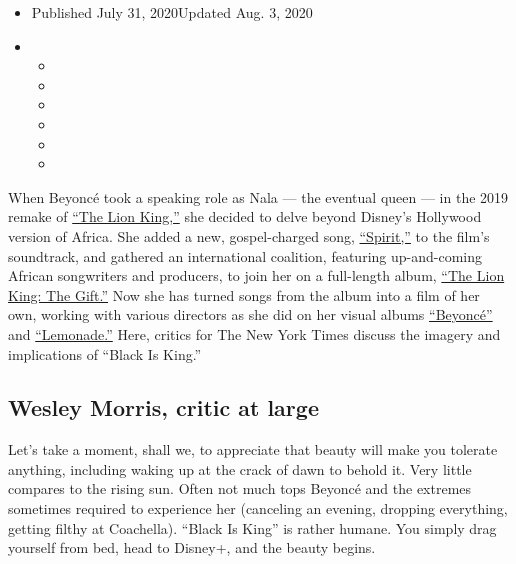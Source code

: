 \begin{itemize}
\item
  Published July 31, 2020Updated Aug. 3, 2020
\item
  \begin{itemize}
  \item
  \item
  \item
  \item
  \item
  \item
  \end{itemize}
\end{itemize}

When Beyoncé took a speaking role as Nala --- the eventual queen --- in
the 2019 remake of
\href{https://www.nytimes.com/2019/07/11/movies/the-lion-king-review.html}{``The
Lion King,''} she decided to delve beyond Disney's Hollywood version of
Africa. She added a new, gospel-charged song,
\href{https://www.nytimes.com/2019/07/12/arts/music/playlist-beyonce-billie-eilish-justin-bieber-ed-sheeran.html}{``Spirit,''}
to the film's soundtrack, and gathered an international coalition,
featuring up-and-coming African songwriters and producers, to join her
on a full-length album,
\href{https://www.nytimes.com/2019/07/24/arts/music/beyonce-the-lion-king-the-gift-review.html}{``The
Lion King: The Gift.''} Now she has turned songs from the album into a
film of her own, working with various directors as she did on her visual
albums
\href{https://www.nytimes.com/2013/12/14/arts/music/beyonces-new-album-is-steamy-and-sleek.html}{``Beyoncé''}
and
\href{https://www.nytimes.com/2016/04/25/arts/music/beyonce-lemonade.html}{``Lemonade.''}
Here, critics for The New York Times discuss the imagery and
implications of ``Black Is King.''

\hypertarget{wesley-morris-critic-at-large}{%
\subsection{Wesley Morris, critic at
large}\label{wesley-morris-critic-at-large}}

Let's take a moment, shall we, to appreciate that beauty will make you
tolerate anything, including waking up at the crack of dawn to behold
it. Very little compares to the rising sun. Often not much tops Beyoncé
and the extremes sometimes required to experience her (canceling an
evening, dropping everything, getting filthy at Coachella). ``Black Is
King'' is rather humane. You simply drag yourself from bed, head to
Disney+, and the beauty begins.

